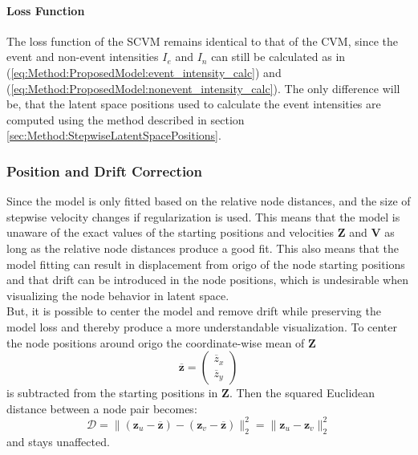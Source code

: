 \paragraph{Loss Function}
The loss function of the SCVM remains identical to that of the CVM, since the event and non-event intensities $I_e$ and $I_n$ can still be calculated as in (\ref{eq:Method:ProposedModel:event_intensity_calc}) and (\ref{eq:Method:ProposedModel:nonevent_intensity_calc}). The only difference will be, that the latent space positions used to calculate the event intensities are computed using the method described in section \ref{sec:Method:StepwiseLatentSpacePositions}.


\subsubsection{Position and Drift Correction}
\label{sec:Method:ProposedModel:PositionCorrection}
Since the model is only fitted based on the relative node distances, and the size of stepwise velocity changes if regularization is used. This means that the model is unaware of the exact values of the starting positions and velocities $\textbf{Z}$ and $\textbf{V}$ as long as the relative node distances produce a good fit. This also means that the model fitting can result in displacement from origo of the node starting positions and that drift can be introduced in the node positions, which is undesirable when visualizing the node behavior in latent space.
\\
But, it is possible to center the model and remove drift while preserving the model loss and thereby produce a more understandable visualization. 
To center the node positions around origo the coordinate-wise mean of $\textbf{Z}$
\begin{equation}
        \overline{\textbf{z}} = 
    \begin{pmatrix}
        \overline{z}_x \\
        \overline{z}_y
    \end{pmatrix}
\end{equation}
is subtracted from the starting positions in $\textbf{Z}$. Then the squared Euclidean distance between a node pair becomes:
\begin{equation}
    \mathcal{D} =\rVert (\textbf{z}_u-\overline{\textbf{z}}) - (\textbf{z}_v-\overline{\textbf{z}}) \rVert_2^2 = 
    \rVert \textbf{z}_u - \textbf{z}_v \rVert_2^2 
\end{equation}
and stays unaffected.
\\\\
